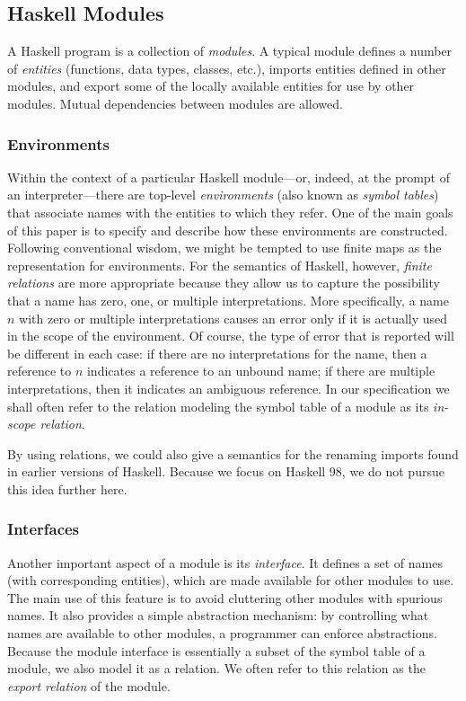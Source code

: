 \subsection{Haskell Modules}
\label{HaskMods}

A Haskell program is a collection of {\em modules}.
A typical module defines a number of {\em entities} (functions, data types,
classes, etc.), imports entities defined in other modules,
and export some of the locally available entities for use by other modules.
Mutual dependencies between modules are allowed.

\subsubsection*{Environments}

Within the context of a particular Haskell module---or,
indeed, at the prompt of an interpreter---there are top-level
{\em environments} (also known as {\em symbol tables}) that
associate names with the entities to which they refer.
One of the main goals of this paper is to
specify and describe how these environments are constructed.
Following conventional wisdom, we might be tempted to use finite
maps as the representation for environments.  For the semantics
of Haskell, however, {\em finite relations} are more appropriate
because they allow us to capture the possibility that a name
has zero, one, or multiple interpretations.  More specifically,
a name $n$ with zero or multiple interpretations causes an error only 
if it is actually used in the scope of the environment. Of course, the type
of error that is reported will be different in each case: if
there are no interpretations for the name, then a reference to $n$
indicates a reference to an unbound name; if there are multiple
interpretations, then it indicates an ambiguous reference.  
In our specification we shall often refer to the relation modeling
the symbol table of a module as its {\em in-scope relation}.

By using relations, we could also give a semantics for the renaming
imports found in earlier versions of Haskell. Because we focus on
Haskell 98, we do not pursue this idea further here.

\subsubsection*{Interfaces}

Another important aspect of a module is its {\em interface}.
It defines a set of names (with corresponding entities), which
are made available for other modules to use.  
The main use of this feature is to avoid cluttering other modules 
with spurious names.
It also provides a simple abstraction mechanism: by controlling
what names are available to other modules, a programmer can enforce 
abstractions.
Because the module interface is essentially a subset of the symbol table
of a module, we also model it as a relation.  We often refer to this
relation as the {\em export relation} of the module.  


